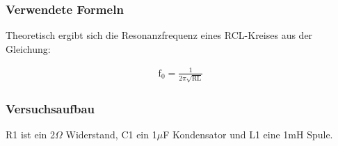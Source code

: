 \documentclass[12pt,a4paper]{article}
\begin{document}
\subsubsection{Verwendete Formeln}

Theoretisch ergibt sich die Resonanzfrequenz eines RCL-Kreises aus der Gleichung:

\begin{align}
\text{f}_0 = \frac{1}{2 \pi \sqrt{\text{RL}}}
\label{eqn:f0}
\end{align}

\subsubsection{Versuchsaufbau}

R1 ist ein 2$\Omega$ Widerstand, C1 ein 1$\mu$F Kondensator und L1 eine 1mH Spule.
\end{document}
